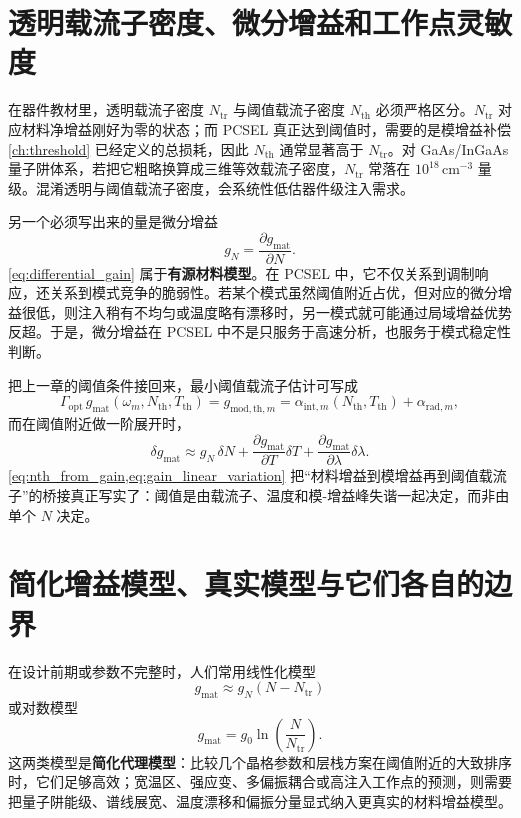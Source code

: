 \section{透明载流子密度、微分增益和工作点灵敏度}
在器件教材里，透明载流子密度 $N_{\mathrm{tr}}$ 与阈值载流子密度 $N_{\mathrm{th}}$ 必须严格区分。$N_{\mathrm{tr}}$ 对应材料净增益刚好为零的状态；而 PCSEL 真正达到阈值时，需要的是模增益补偿 \cref{ch:threshold} 已经定义的总损耗，因此 $N_{\mathrm{th}}$ 通常显著高于 $N_{\mathrm{tr}}$。对 GaAs/InGaAs 量子阱体系，若把它粗略换算成三维等效载流子密度，$N_{\mathrm{tr}}$ 常落在 $10^{18}\,\mathrm{cm}^{-3}$ 量级。混淆透明与阈值载流子密度，会系统性低估器件级注入需求。

另一个必须写出来的量是微分增益
\begin{equation}
 g_N = \frac{\partial g_{\mathrm{mat}}}{\partial N}.
\label{eq:differential_gain}
\end{equation}
\cref{eq:differential_gain} 属于\textbf{有源材料模型}。在 PCSEL 中，它不仅关系到调制响应，还关系到模式竞争的脆弱性。若某个模式虽然阈值附近占优，但对应的微分增益很低，则注入稍有不均匀或温度略有漂移时，另一模式就可能通过局域增益优势反超。于是，微分增益在 PCSEL 中不是只服务于高速分析，也服务于模式稳定性判断。

把上一章的阈值条件接回来，最小阈值载流子估计可写成
\begin{equation}
\Gamma_{\mathrm{opt}}\,g_{\mathrm{mat}}(\omega_m,N_{\mathrm{th}},T_{\mathrm{th}})
=
g_{\mathrm{mod,th},m}
=
\alpha_{\mathrm{int},m}(N_{\mathrm{th}},T_{\mathrm{th}})+\alpha_{\mathrm{rad},m},
\label{eq:nth_from_gain}
\end{equation}
而在阈值附近做一阶展开时，
\begin{equation}
\delta g_{\mathrm{mat}}
\approx
g_N\,\delta N
+
\frac{\partial g_{\mathrm{mat}}}{\partial T}\delta T
+
\frac{\partial g_{\mathrm{mat}}}{\partial \lambda}\delta\lambda.
\label{eq:gain_linear_variation}
\end{equation}
\cref{eq:nth_from_gain,eq:gain_linear_variation} 把“材料增益到模增益再到阈值载流子”的桥接真正写实了：阈值是由载流子、温度和模-增益峰失谐一起决定，而非由单个 $N$ 决定。

\section{简化增益模型、真实模型与它们各自的边界}
在设计前期或参数不完整时，人们常用线性化模型
\begin{equation}
 g_{\mathrm{mat}} \approx g_N (N-N_{\mathrm{tr}})
\label{eq:gain_linearized}
\end{equation}
或对数模型
\begin{equation}
 g_{\mathrm{mat}} = g_0 \ln\!\left(\frac{N}{N_{\mathrm{tr}}}\right).
\label{eq:gain_log}
\end{equation}
这两类模型是\textbf{简化代理模型}：比较几个晶格参数和层栈方案在阈值附近的大致排序时，它们足够高效；宽温区、强应变、多偏振耦合或高注入工作点的预测，则需要把量子阱能级、谱线展宽、温度漂移和偏振分量显式纳入更真实的材料增益模型。

